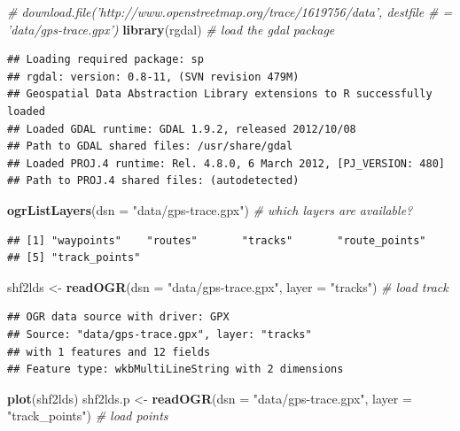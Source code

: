 \documentclass[]{article}
\newenvironment{Shaded}{}{}
\newcommand{\KeywordTok}[1]{\textcolor[rgb]{0.00,0.44,0.13}{\textbf{{#1}}}}
\newcommand{\DataTypeTok}[1]{\textcolor[rgb]{0.56,0.13,0.00}{{#1}}}
\newcommand{\StringTok}[1]{\textcolor[rgb]{0.25,0.44,0.63}{{#1}}}
\newcommand{\CommentTok}[1]{\textcolor[rgb]{0.38,0.63,0.69}{\textit{{#1}}}}
\newcommand{\NormalTok}[1]{{#1}}
\begin{document}
\begin{Shaded}
\begin{Highlighting}[]
\CommentTok{# download.file('http://www.openstreetmap.org/trace/1619756/data', destfile}
\CommentTok{# = 'data/gps-trace.gpx')}
\KeywordTok{library}\NormalTok{(rgdal)  }\CommentTok{# load the gdal package}
\end{Highlighting}
\end{Shaded}

\begin{verbatim}
## Loading required package: sp
## rgdal: version: 0.8-11, (SVN revision 479M)
## Geospatial Data Abstraction Library extensions to R successfully loaded
## Loaded GDAL runtime: GDAL 1.9.2, released 2012/10/08
## Path to GDAL shared files: /usr/share/gdal
## Loaded PROJ.4 runtime: Rel. 4.8.0, 6 March 2012, [PJ_VERSION: 480]
## Path to PROJ.4 shared files: (autodetected)
\end{verbatim}

\begin{Shaded}
\begin{Highlighting}[]
\KeywordTok{ogrListLayers}\NormalTok{(}\DataTypeTok{dsn =} \StringTok{"data/gps-trace.gpx"}\NormalTok{)  }\CommentTok{# which layers are available?}
\end{Highlighting}
\end{Shaded}

\begin{verbatim}
## [1] "waypoints"    "routes"       "tracks"       "route_points"
## [5] "track_points"
\end{verbatim}

\begin{Shaded}
\begin{Highlighting}[]
\NormalTok{shf2lds <-}\StringTok{ }\KeywordTok{readOGR}\NormalTok{(}\DataTypeTok{dsn =} \StringTok{"data/gps-trace.gpx"}\NormalTok{, }\DataTypeTok{layer =} \StringTok{"tracks"}\NormalTok{)  }\CommentTok{# load track}
\end{Highlighting}
\end{Shaded}

\begin{verbatim}
## OGR data source with driver: GPX 
## Source: "data/gps-trace.gpx", layer: "tracks"
## with 1 features and 12 fields
## Feature type: wkbMultiLineString with 2 dimensions
\end{verbatim}

\begin{Shaded}
\begin{Highlighting}[]
\KeywordTok{plot}\NormalTok{(shf2lds)}
\NormalTok{shf2lds.p <-}\StringTok{ }\KeywordTok{readOGR}\NormalTok{(}\DataTypeTok{dsn =} \StringTok{"data/gps-trace.gpx"}\NormalTok{, }\DataTypeTok{layer =} \StringTok{"track_points"}\NormalTok{)  }\CommentTok{# load points}
\end{Highlighting}
\end{Shaded}
\end{document}
